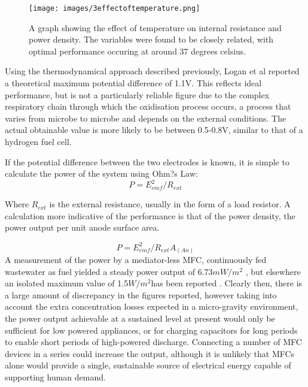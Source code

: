 \documentclass[12pt]{article}
\begin{document}
\begin{figure}[ht]
\centering
\texttt{[image: images/3effectoftemperature.png]}
\caption{A graph showing the effect of temperature on internal resistance and power density. The variables were found to be closely related, with optimal performance occuring at around 37 degrees celsius.\cite{li2013effect}}
\label{fig:3effectoftemperature}
\end{figure}

Using the thermodynamical approach described previously, Logan et al \cite{logan2006microbial} reported a theoretical maximum potential difference of 1.1V. This reflects ideal performance, but is not a particularly reliable figure due to the complex respiratory chain through which the oxidisation process occurs, a process that varies from microbe to microbe and depends on the external conditions. \cite{du2007state} The actual obtainable value is more likely to be between 0.5-0.8V, similar to that of a hydrogen fuel cell.\cite{logan2005simultaneous}

If the potential difference between the two electrodes is known, it is simple to calculate the power of the system using Ohm?s Law:
\begin{equation}
P = E_{emf} ^{2} / R_{ext}
\end{equation}

Where $R_{ext}$ is the external resistance, usually in the form of a load resistor. A calculation more indicative of the performance is that of the power density, the power output per unit anode surface area.

\begin{equation}
P = E_{emf} ^{2} / R_{ext} A_(An)
\end{equation}
A measurement of the power by a mediator-less MFC, continuously fed wastewater as fuel yielded a steady power output of 6.73$mW/m^{2}$ \cite{ghangrekar2006microbial}, but elsewhere an isolated maximum value of 1.5$W/m^{2}$has been reported \cite{logan2008microbial}. Clearly then, there is a large amount of discrepancy in the figures reported, however taking into account the extra concentration losses expected in a micro-gravity environment, the power output achievable at a sustained level at present would only be sufficient for low powered appliances, or for charging capacitors for long periods to enable short periods of high-powered discharge. Connecting a number of MFC devices in a series could increase the output,\cite{meehan2011energy} although it is unlikely that MFCs alone would provide a single, sustainable source of electrical energy capable of supporting human demand.
\end{document}
